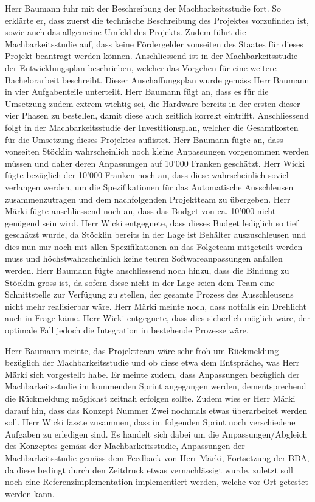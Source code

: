 \documentclass[parskip=full, a4paper]{scrreprt}
\begin{document}
Herr Baumann fuhr mit der Beschreibung der Machbarkeitsstudie fort. So erklärte er, dass zuerst die technische Beschreibung des Projektes vorzufinden ist, sowie auch das allgemeine Umfeld des Projekts. Zudem führt die Machbarkeitsstudie auf, dass keine Fördergelder vonseiten des Staates für dieses Projekt beantragt werden können. Anschliessend ist in der Machbarkeitsstudie der Entwicklungsplan beschrieben, welcher das Vorgehen für eine weitere Bachelorarbeit beschreibt. Dieser Anschaffungsplan wurde gemäss Herr Baumann in vier Aufgabenteile unterteilt. Herr Baumann fügt an, dass es für die Umsetzung zudem extrem wichtig sei, die Hardware bereits in der ersten dieser vier Phasen zu bestellen, damit diese auch zeitlich korrekt eintrifft. Anschliessend folgt in der Machbarkeitsstudie der Investitionsplan, welcher die Gesamtkosten für die Umsetzung dieses Projektes auflistet. Herr Baumann fügte an, dass vonseiten Stöcklin wahrscheinlich noch kleine Anpassungen vorgenommen werden müssen und daher deren Anpassungen auf 10'000 Franken geschätzt. Herr Wicki fügte bezüglich der 10'000 Franken noch an, dass diese wahrscheinlich soviel verlangen werden, um die Spezifikationen für das Automatische Ausschleusen zusammenzutragen und dem nachfolgenden Projektteam zu übergeben. Herr Märki fügte anschliessend noch an, dass das Budget von ca. 10'000 nicht genügend sein wird. Herr Wicki entgegnete, dass dieses Budget lediglich so tief geschätzt wurde, da Stöcklin bereits in der Lage ist Behälter auszuschleusen und dies nun nur noch mit allen Spezifikationen an das Folgeteam mitgeteilt werden muss und höchstwahrscheinlich keine teuren Softwareanpassungen anfallen werden. Herr Baumann fügte anschliessend noch hinzu, dass die Bindung zu Stöcklin gross ist, da sofern diese nicht in der Lage seien dem Team eine Schnittstelle zur Verfügung zu stellen, der gesamte Prozess des Ausschleusens nicht mehr realisierbar wäre. Herr Märki meinte noch, dass notfalls ein Drehlicht auch in Frage käme. Herr Wicki entgegnete, dass dies sicherlich möglich wäre, der optimale Fall jedoch die Integration in bestehende Prozesse wäre.

Herr Baumann meinte, das Projektteam wäre sehr froh um Rückmeldung bezüglich der Machbarkeitsstudie und ob diese etwa dem Entspräche, was Herr Märki sich vorgestellt habe. Er meinte zudem, dass Anpassungen bezüglich der Machbarkeitsstudie im kommenden Sprint angegangen werden, dementsprechend die Rückmeldung möglichst zeitnah erfolgen sollte.
Zudem wies er Herr Märki darauf hin, dass das Konzept Nummer Zwei nochmals etwas überarbeitet werden soll.
Herr Wicki fasste zusammen, dass im folgenden Sprint noch verschiedene Aufgaben zu erledigen sind. Es handelt sich dabei um die Anpassungen/Abgleich des Konzeptes gemäss der Machbarkeitsstudie, Anpassungen der Machbarkeitsstudie gemäss dem Feedback von Herr Märki, Fortsetzung der BDA, da diese bedingt durch den Zeitdruck etwas vernachlässigt wurde, zuletzt soll noch eine Referenzimplementation implementiert werden, welche vor Ort getestet werden kann.
\end{document}

